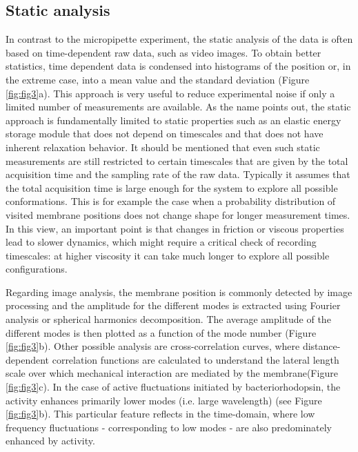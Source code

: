 \documentclass[graybox]{svmult}
\begin{document}
\subsection{Static analysis}
In contrast to the micropipette experiment, the static analysis of the data is often based on time-dependent raw data, such as video images. To obtain better statistics, time dependent data is condensed into histograms of the position or, in the extreme case, into a mean value and the standard deviation (Figure \ref{fig:fig3}a). This approach is very useful to reduce experimental noise if only a limited number of measurements are available. As the name points out, the static approach is fundamentally limited to static properties such as an elastic energy storage module that does not depend on timescales and that does not have inherent relaxation behavior. It should be mentioned that even such static measurements are still restricted to certain timescales that are given by the total acquisition time and the sampling rate of the raw data. Typically it assumes that the total acquisition time is large enough for the system to explore all possible conformations. This is for example the case when a probability distribution of visited membrane positions does not change shape for longer measurement times. In this view, an important point is that changes in friction or viscous properties lead to slower dynamics, which might require a critical check of recording timescales: at higher viscosity it can take much longer to explore all possible configurations.

Regarding image analysis, the membrane position is commonly detected by image processing and the amplitude for the different modes is extracted using Fourier analysis or spherical harmonics decomposition.  The average amplitude of the different modes is then plotted as a function of the mode number (Figure \ref{fig:fig3}b). Other possible analysis are cross-correlation curves, where distance-dependent correlation functions are calculated to understand the lateral length scale over which mechanical interaction are mediated by the membrane(Figure \ref{fig:fig3}c). In the case of active fluctuations initiated by bacteriorhodopsin, the activity enhances primarily lower modes (i.e. large wavelength) \cite{Faris:2009} (see Figure \ref{fig:fig3}b). This particular feature reflects in the time-domain, where low frequency fluctuations - corresponding to low modes - are also predominately enhanced by activity.  
\end{document}
